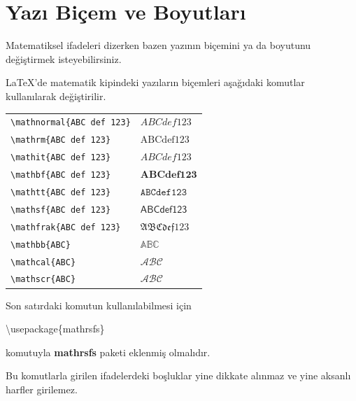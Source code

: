 \documentclass[
  10pt,
]{scrbook}
\newenvironment{Shaded}{\begin{snugshade}}{\end{snugshade}}
\newcommand{\BuiltInTok}[1]{#1}
\newcommand{\ExtensionTok}[1]{#1}
\newcommand{\NormalTok}[1]{#1}
\theoremstyle{definition}
\theoremstyle{definition}
\theoremstyle{definition}
\theoremstyle{definition}
\theoremstyle{remark}
\begin{document}
\hypertarget{yazux131-biuxe7em-ve-boyutlarux131}{%
\section{Yazı Biçem ve Boyutları}\label{yazux131-biuxe7em-ve-boyutlarux131}}

Matematiksel ifadeleri dizerken bazen yazının biçemini ya da boyutunu değiştirmek isteyebilirsiniz.

LaTeX'de matematik kipindeki yazıların biçemleri aşağıdaki komutlar kullanılarak değiştirilir.

\begin{longtable}[]{@{}ll@{}}
\toprule
\endhead
\texttt{\textbackslash{}mathnormal\{ABC\ def\ 123\}} & \(ABC def 123\) \\
\texttt{\textbackslash{}mathrm\{ABC\ def\ 123\}} & \(\mathrm{ABC def 123}\) \\
\texttt{\textbackslash{}mathit\{ABC\ def\ 123\}} & \(\mathit{ABC def 123}\) \\
\texttt{\textbackslash{}mathbf\{ABC\ def\ 123\}} & \(\mathbf{ABC def 123}\) \\
\texttt{\textbackslash{}mathtt\{ABC\ def\ 123\}} & \(\mathtt{ABC def 123}\) \\
\texttt{\textbackslash{}mathsf\{ABC\ def\ 123\}} & \(\mathsf{ABC def 123}\) \\
\texttt{\textbackslash{}mathfrak\{ABC\ def\ 123\}} & \(\mathfrak{ABC def 123}\) \\
\texttt{\textbackslash{}mathbb\{ABC\}} & \(\mathbb{ABC}\) \\
\texttt{\textbackslash{}mathcal\{ABC\}} & \(\mathcal{ABC}\) \\
\texttt{\textbackslash{}mathscr\{ABC\}} & \(\mathscr{ABC}\) \\
\bottomrule
\end{longtable}

Son satırdaki komutun kullanılabilmesi için

\begin{Shaded}
\begin{Highlighting}[]
\BuiltInTok{\textbackslash{}usepackage}\NormalTok{\{}\ExtensionTok{mathrsfs}\NormalTok{\}}
\end{Highlighting}
\end{Shaded}

komutuyla \textbf{mathrsfs} paketi eklenmiş olmalıdır.

Bu komutlarla girilen ifadelerdeki boşluklar yine dikkate alınmaz ve yine aksanlı harfler girilemez.
\end{document}
